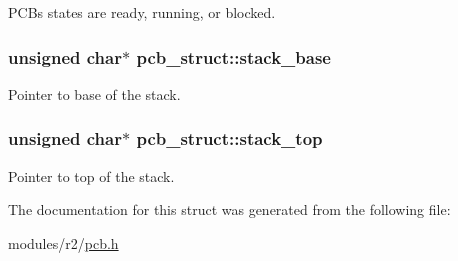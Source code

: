 P\+CB\textquotesingle{}s states are ready, running, or blocked. 

\subsubsection[{\texorpdfstring{stack\+\_\+base}{stack_base}}]{\setlength{\rightskip}{0pt plus 5cm}unsigned char$\ast$ pcb\+\_\+struct\+::stack\+\_\+base}\hypertarget{structpcb__struct_a8365cb3b483002fecc259df14301f30f}{}\label{structpcb__struct_a8365cb3b483002fecc259df14301f30f}


Pointer to base of the stack. 

\subsubsection[{\texorpdfstring{stack\+\_\+top}{stack_top}}]{\setlength{\rightskip}{0pt plus 5cm}unsigned char$\ast$ pcb\+\_\+struct\+::stack\+\_\+top}\hypertarget{structpcb__struct_a277e7babba5b14dc71ffc08bf69f54c3}{}\label{structpcb__struct_a277e7babba5b14dc71ffc08bf69f54c3}


Pointer to top of the stack. 



The documentation for this struct was generated from the following file\+:\begin{DoxyCompactItemize}
\item 
modules/r2/\hyperlink{pcb_8h}{pcb.\+h}\end{DoxyCompactItemize}
